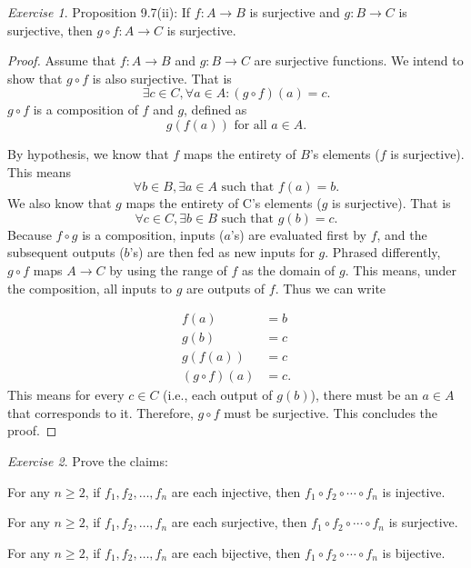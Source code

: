 \documentclass[12pt,oneside]{amsart}
\theoremstyle{remark}
\newtheorem{exer}{Exercise}
\begin{document}
\newpage
\begin{exer}
Proposition 9.7(ii): If $f: A \to B$ is surjective and $g: B \to C$ is surjective, then $g \circ f: A \to C$ is surjective.
%
\end{exer}

\begin{proof}
Assume that $f: A \to B$ and $g: B \to C$ are surjective functions. We intend to show that $g \circ f$ is also surjective. That is \[ \exists c \in C, \forall a \in A: (g \circ f)(a) = c. \] $g \circ f$ is a composition of $f$ and $g$, defined as \[ g(f(a)) \text{ for all } a \in A. \]

By hypothesis, we know that $f$ maps the entirety of $B$'s elements ($f$ is surjective). This means \[ \forall b \in B, \exists a \in A \text{ such that } f(a) = b. \] We also know that $g$ maps the entirety of C's elements ($g$ is surjective). That is \[ \forall c \in C, \exists b \in B \text{ such that } g(b) = c. \] Because $f \circ g$ is a composition, inputs ($a$'s) are evaluated first by $f$, and the subsequent outputs ($b$'s) are then fed as new inputs for $g$. Phrased differently, $g \circ f$ maps $A \to C$ by using the range of $f$ as the domain of $g$. This means, under the composition, all inputs to $g$ are outputs of $f$. Thus we can write

\begin{equation}
\begin{split}
         f(a) &= b \\
         g(b) &= c \\
      g(f(a)) &= c \\
(g \circ f)(a) &= c.
\end{split}
\end{equation}
This means for every $c \in C$ (i.e., each output of $g(b)$), there must be an $a \in A$ that corresponds to it. Therefore, $g \circ f$ must be surjective. This concludes the proof.
\end{proof}

\newpage
\begin{exer}
Prove the claims:

For any $n \geq 2$, if $f_1, f_2, \dotsc, f_n$ are each injective, then $f_1 \circ f_2 \circ \dotsb \circ f_n$ is injective.

For any $n \geq 2$, if $f_1, f_2, \dotsc, f_n$ are each surjective, then $f_1 \circ f_2 \circ \dotsb \circ f_n$ is surjective.

For any $n \geq 2$, if $f_1, f_2, \dotsc, f_n$ are each bijective, then $f_1 \circ f_2 \circ \dotsb \circ f_n$ is bijective.
%
\end{exer}
\end{document}

